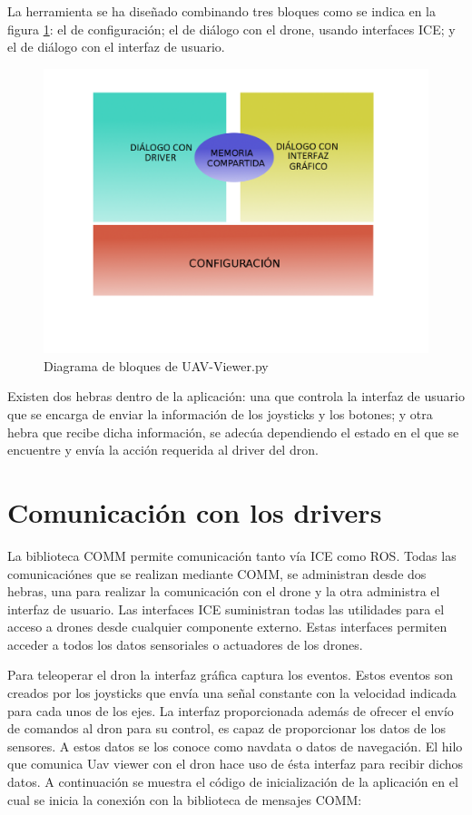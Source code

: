 La herramienta se ha diseñado combinando tres bloques como se indica en la figura \ref{fig:memoriaUav}: el de configuración; el de diálogo con el drone, usando interfaces ICE; y el de diálogo con el interfaz de usuario.

\begin{figure}[H]
  \centering
  \includegraphics[scale=0.3]{imagenes/MemoriaCompartidaUAV.png}
  \caption{Diagrama de bloques de UAV-Viewer.py}
  \label{fig:memoriaUav}
\end{figure}

Existen dos hebras dentro de la aplicación: una que controla la interfaz de usuario que se encarga de enviar la información de los joysticks y los botones; y otra hebra que recibe dicha información, se adecúa dependiendo el estado en el que se encuentre y envía la acción requerida al driver del dron.


\section{Comunicación con los drivers} 


La biblioteca COMM permite comunicación tanto vía ICE como ROS. Todas las comunicaciónes que se realizan mediante COMM, se administran desde dos hebras, una para realizar la comunicación con el drone y la otra administra el interfaz de usuario. Las interfaces ICE suministran todas las utilidades para el acceso a drones desde cualquier componente externo. Estas interfaces permiten acceder a todos los datos sensoriales o actuadores de los drones.

Para teleoperar el dron la interfaz gráfica captura los eventos. Estos eventos son creados por los joysticks que envía una señal constante con la velocidad indicada para cada unos de los ejes. La interfaz proporcionada además de ofrecer el envío de comandos al dron para su control, es capaz de proporcionar los datos de los sensores. A estos datos se los conoce como navdata o datos de navegación. El hilo que comunica Uav viewer con el dron hace uso de ésta interfaz para recibir dichos datos. A continuación se muestra el código de inicialización de la aplicación en el cual se inicia la conexión con la biblioteca de mensajes COMM:

